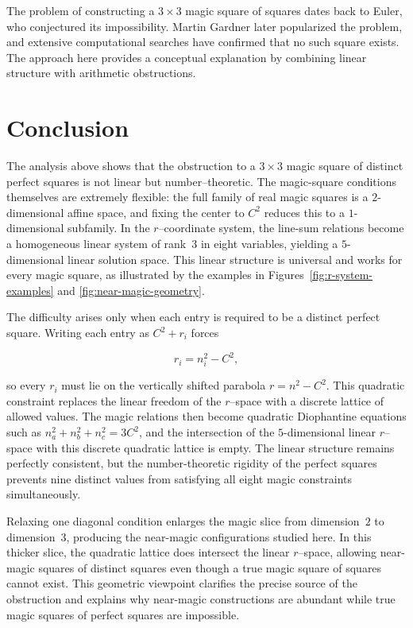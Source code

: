 \documentclass[12pt]{article}
\begin{document}
The problem of constructing a $3\times 3$ magic square of squares dates back
to Euler, who conjectured its impossibility.  Martin Gardner later
popularized the problem, and extensive computational searches have confirmed
that no such square exists.  The approach here provides a conceptual
explanation by combining linear structure with arithmetic obstructions.



\section*{Conclusion}

The analysis above shows that the obstruction to a $3\times 3$ magic square of
distinct perfect squares is not linear but number–theoretic.  The magic-square
conditions themselves are extremely flexible: the full family of real magic
squares is a $2$-dimensional affine space, and fixing the center to $C^2$
reduces this to a $1$-dimensional subfamily.  In the $r$--coordinate system,
the line-sum relations become a homogeneous linear system of rank~$3$ in eight
variables, yielding a $5$-dimensional linear solution space.  This linear
structure is universal and works for every magic square, as illustrated by the
examples in Figures~\ref{fig:r-system-examples} and
\ref{fig:near-magic-geometry}.

The difficulty arises only when each entry is required to be a distinct
perfect square.  Writing each entry as $C^2+r_i$ forces


\[
r_i = n_i^2 - C^2,
\]


so every $r_i$ must lie on the vertically shifted parabola $r=n^2-C^2$.  This
quadratic constraint replaces the linear freedom of the $r$--space with a
discrete lattice of allowed values.  The magic relations then become quadratic
Diophantine equations such as $n_a^2+n_b^2+n_c^2=3C^2$, and the intersection
of the $5$-dimensional linear $r$--space with this discrete quadratic lattice
is empty.  The linear structure remains perfectly consistent, but the
number-theoretic rigidity of the perfect squares prevents nine distinct values
from satisfying all eight magic constraints simultaneously.

Relaxing one diagonal condition enlarges the magic slice from dimension~$2$ to
dimension~$3$, producing the near-magic configurations studied here.  In this
thicker slice, the quadratic lattice does intersect the linear $r$--space,
allowing near-magic squares of distinct squares even though a true magic
square of squares cannot exist.  This geometric viewpoint clarifies the
precise source of the obstruction and explains why near-magic constructions
are abundant while true magic squares of perfect squares are impossible.
\end{document}
